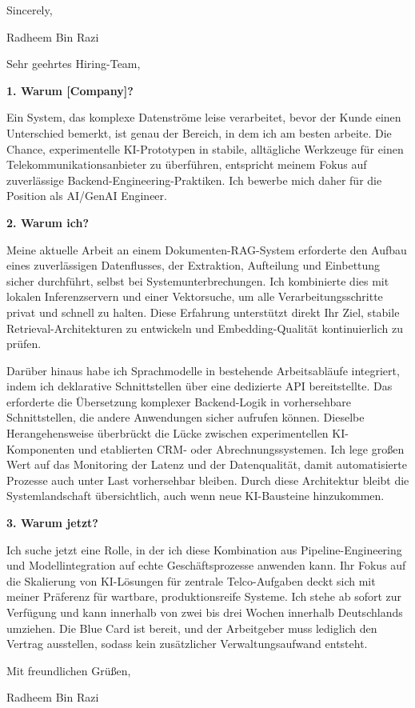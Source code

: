 \documentclass[11pt,a4paper]{coverletter}
\begin{document}
\closing{Sincerely,}{Radheem Bin Razi}

\clearpage
{}


\opening{Sehr geehrtes Hiring-Team,}

\vspace{8pt}\noindent\textbf{1. Warum [Company]?}\par\vspace{3pt}

Ein System, das komplexe Datenströme leise verarbeitet, bevor der Kunde einen Unterschied bemerkt, ist genau der Bereich, in dem ich am besten arbeite. Die Chance, experimentelle KI-Prototypen in stabile, alltägliche Werkzeuge für einen Telekommunikationsanbieter zu überführen, entspricht meinem Fokus auf zuverlässige Backend-Engineering-Praktiken. Ich bewerbe mich daher für die Position als AI/GenAI Engineer.

\vspace{8pt}\noindent\textbf{2. Warum ich?}\par\vspace{3pt}

Meine aktuelle Arbeit an einem Dokumenten-RAG-System erforderte den Aufbau eines zuverlässigen Datenflusses, der Extraktion, Aufteilung und Einbettung sicher durchführt, selbst bei Systemunterbrechungen. Ich kombinierte dies mit lokalen Inferenzservern und einer Vektorsuche, um alle Verarbeitungsschritte privat und schnell zu halten. Diese Erfahrung unterstützt direkt Ihr Ziel, stabile Retrieval-Architekturen zu entwickeln und Embedding-Qualität kontinuierlich zu prüfen.

Darüber hinaus habe ich Sprachmodelle in bestehende Arbeitsabläufe integriert, indem ich deklarative Schnittstellen über eine dedizierte API bereitstellte. Das erforderte die Übersetzung komplexer Backend-Logik in vorhersehbare Schnittstellen, die andere Anwendungen sicher aufrufen können. Dieselbe Herangehensweise überbrückt die Lücke zwischen experimentellen KI-Komponenten und etablierten CRM- oder Abrechnungssystemen. Ich lege großen Wert auf das Monitoring der Latenz und der Datenqualität, damit automatisierte Prozesse auch unter Last vorhersehbar bleiben. Durch diese Architektur bleibt die Systemlandschaft übersichtlich, auch wenn neue KI-Bausteine hinzukommen.

\vspace{8pt}\noindent\textbf{3. Warum jetzt?}\par\vspace{3pt}

Ich suche jetzt eine Rolle, in der ich diese Kombination aus Pipeline-Engineering und Modellintegration auf echte Geschäftsprozesse anwenden kann. Ihr Fokus auf die Skalierung von KI-Lösungen für zentrale Telco-Aufgaben deckt sich mit meiner Präferenz für wartbare, produktionsreife Systeme. Ich stehe ab sofort zur Verfügung und kann innerhalb von zwei bis drei Wochen innerhalb Deutschlands umziehen. Die Blue Card ist bereit, und der Arbeitgeber muss lediglich den Vertrag ausstellen, sodass kein zusätzlicher Verwaltungsaufwand entsteht.

\closing{Mit freundlichen Grüßen,}{Radheem Bin Razi}
\end{document}
